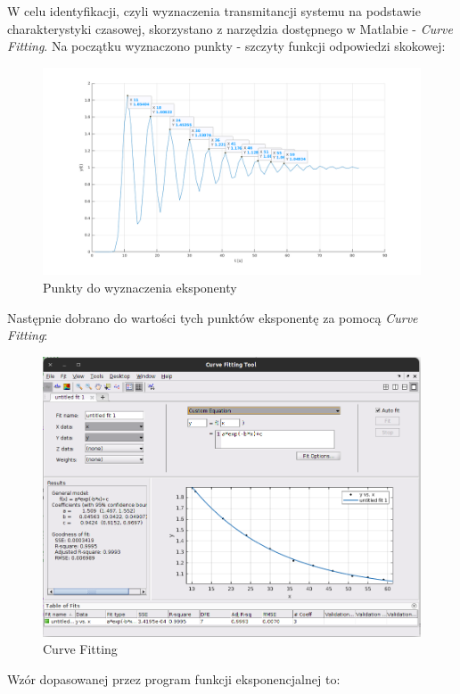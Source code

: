 \documentclass[12pt]{article}
\begin{document}
W celu identyfikacji, czyli wyznaczenia transmitancji systemu na podstawie charakterystyki czasowej, skorzystano z narzędzia dostępnego w Matlabie - \textit{Curve Fitting}. Na początku wyznaczono punkty - szczyty funkcji odpowiedzi skokowej:

\begin{figure}[H]
    \centering
    \includegraphics[width=18cm]{punkty.png}
    \caption{Punkty do wyznaczenia eksponenty}
\end{figure}

Następnie dobrano do wartości tych punktów eksponentę za pomocą \textit{Curve Fitting}:

\begin{figure}[H]
    \centering
    \includegraphics[width=18cm]{curve_fitting.png}
    \caption{Curve Fitting}
\end{figure}

Wzór dopasowanej przez program funkcji eksponencjalnej to:
\end{document}
